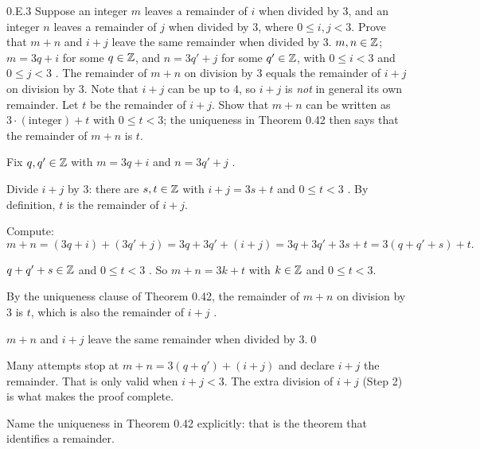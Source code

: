 \begin{bookex}[essential]{0.E.3}
Suppose an integer $m$ leaves a remainder of $i$ when divided by $3$, and an integer $n$ leaves a remainder of $j$ when divided by $3$, where $0\le i,j<3$. Prove that $m+n$ and $i+j$ leave the same remainder when divided by $3$.
\solution
\given $m,n\in\mathbb{Z}$; $m=3q+i$ for some $q\in\mathbb{Z}$, and $n=3q'+j$ for some $q'\in\mathbb{Z}$, with $0\le i<3$ and $0\le j<3$ .
\goal The remainder of $m+n$ on division by $3$ equals the remainder of $i+j$ on division by $3$. Note that $i+j$ can be up to $4$, so $i+j$ is \emph{not} in general its own remainder.
\plan Let $t$ be the remainder of $i+j$. Show that $m+n$ can be written as $3\cdot(\text{integer})+t$ with $0\le t<3$; the uniqueness in Theorem 0.42 then says that the remainder of $m+n$ is $t$.
\begin{steps}
\item Fix $q,q'\in\mathbb{Z}$ with $m=3q+i$ and $n=3q'+j$ .
\item Divide $i+j$ by $3$: there are $s,t\in\mathbb{Z}$ with $i+j=3s+t$ and $0\le t<3$ . By definition, $t$ is the remainder of $i+j$.
\item Compute:
\[
m+n=(3q+i)+(3q'+j)=3q+3q'+(i+j)=3q+3q'+3s+t=3(q+q'+s)+t .
\]
\item $q+q'+s\in\mathbb{Z}$  and $0\le t<3$ . So $m+n=3k+t$ with $k\in\mathbb{Z}$ and $0\le t<3$.
\item By the uniqueness clause of Theorem 0.42, the remainder of $m+n$ on division by $3$ is $t$, which is also the remainder of $i+j$ .
\end{steps}
\conclusion $m+n$ and $i+j$ leave the same remainder when divided by $3$.\qed
\begin{compare}
\item Many attempts stop at $m+n=3(q+q')+(i+j)$ and declare $i+j$ the remainder. That is only valid when $i+j<3$. The extra division of $i+j$ (Step 2) is what makes the proof complete.
\item Name the uniqueness in Theorem 0.42 explicitly: that is the theorem that identifies a remainder.
\end{compare}
\end{bookex}

